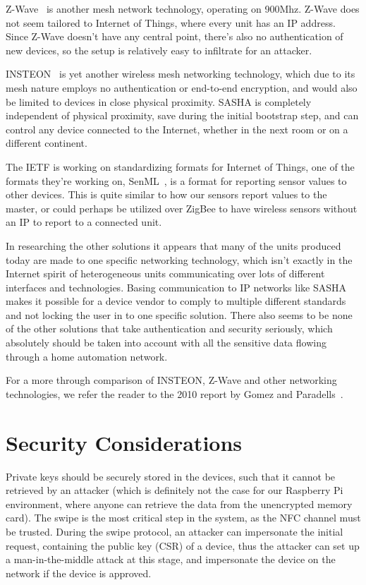 Z-Wave~\cite[Annex~A]{z-wave} is another mesh network technology, operating on 900Mhz. Z-Wave does not seem tailored to Internet of Things, where every unit has an IP address. Since Z-Wave doesn't have any central point, there's also no authentication of new devices, so the setup is relatively easy to infiltrate for an attacker.

INSTEON~\cite{insteon} is yet another wireless mesh networking technology, which due to its mesh nature employs no authentication or end-to-end encryption, and would also be limited to devices in close physical proximity. SASHA is completely independent of physical proximity, save during the initial bootstrap step, and can control any device connected to the Internet, whether in the next room or on a different continent.

The IETF is working on standardizing formats for Internet of Things, one of the formats they're working on, SenML~\cite{senml}, is a format for reporting sensor values to other devices. This is quite similar to how our sensors report values to the master, or could perhaps be utilized over ZigBee to have wireless sensors without an IP to report to a connected unit.

In researching the other solutions it appears that many of the units produced today are made to one specific networking technology, which isn't exactly in the Internet spirit of heterogeneous units communicating over lots of different interfaces and technologies. Basing communication to IP networks like SASHA makes it possible for a device vendor to comply to multiple different standards and not locking the user in to one specific solution. There also seems to be none of the other solutions that take authentication and security seriously, which absolutely should be taken into account with all the sensitive data flowing through a home automation network.

For a more through comparison of INSTEON, Z-Wave and other networking technologies, we refer the reader to the 2010 report by Gomez and Paradells~\cite{comparison-of-technologies}.


\section{Security Considerations}

Private keys should be securely stored in the devices, such that it cannot be retrieved by an attacker (which is definitely not the case for our Raspberry Pi environment, where anyone can retrieve the data from the unencrypted memory card).
The swipe is the most critical step in the system, as the NFC channel must be trusted. During the swipe protocol, an attacker can impersonate the initial request, containing the public key (CSR) of a device, thus the attacker can set up a man-in-the-middle attack at this stage, and impersonate the device on the network if the device is approved.

